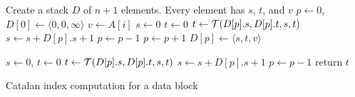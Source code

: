 \begin{algorithm}
\SetAlgoNoLine
{}
Create a stack $D$ of $n+1$ elements.  Every element has $s$, $t$, and $v$ \;
$p \gets 0$, $D[0] \gets \langle 0,0,\infty \rangle$ \;
 {
  $v \gets A[i]$ \; $s \gets 0$ \; $t \gets 0$ \;
   {
    $t \gets {\cal T}(D[p].s, D[p].t, s, t)$ \;
    $s \gets s + D[p].s + 1$ \;
    $p \gets p - 1$ \;
  }
  $p \gets p + 1$ \;
  $D[p] \gets \langle s,t,{v}\rangle$ \;
}

$s \gets 0$, $t \gets 0$ \;
 {
  $t \gets {\cal T}(D[p].s, D[p].t, s, t)$ \;
  $s \gets s + D[p].s + 1$ \;
  $p \gets p - 1$ \;
}
return $t$ \;

\caption{Catalan index computation for a data block}
\label{alg:cartesian-encode-offline}
\end{algorithm}
